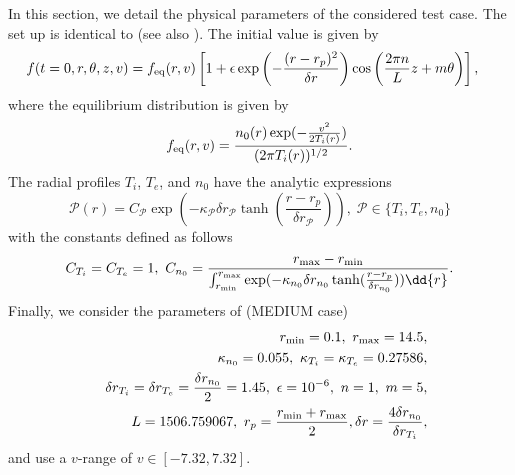 In this section, we detail the physical parameters of the considered test case. The set up is identical to \cite{Crouseilles:2018} (see also \cite{Coulette:2013, Crouseilles:2014}). The initial value is given by 
\begin{align*}
  f(t=0,r,\theta,z,v) &=
  f_{\rm eq}(r,v)\left[1+\epsilon \exp\left(-\frac{(r-r_p)^2}{\delta r}\right)\cos\left(\frac{2\pi n}{L}z+m\theta\right)\right],
\end{align*}
where the equilibrium distribution is given by
\begin{equation} \label{eq:equilibrium}
  f_{\rm eq}(r,v)=\frac{n_0(r)\exp(-\frac{v^2}{2T_i(r)})}{(2\pi T_i(r))^{1/2}}.
\end{equation}
The radial profiles $T_i$, $T_e$, and $n_0$ have the analytic expressions
$$
  \mathcal{P}(r) = C_\mathcal{P}\exp\left(-\kappa_\mathcal{P}\delta r_{\mathcal{P}}\tanh(\frac{r-r_p}{\delta r_{\mathcal{P}}})\right), \; \mathcal{P}\in \{T_i,T_e,n_0\}
$$
with the constants defined as follows
$$
  C_{T_i}=C_{T_e}=1,\ C_{n_0}=\frac{r_{\rm max}-r_{\rm min}}{
\int_{r_{\rm min}}^{r_{\rm max}}\exp(-\kappa_{n_0}\delta r_{n_0}\tanh(\frac{r-r_p}{\delta r_{n_0}}))\dd{r}}.
$$
Finally, we consider the parameters of \cite{Coulette:2013} (MEDIUM case)
\begin{eqnarray*}
  &&r_{\rm min} = 0.1,\ r_{\rm max} = 14.5,\\
  && \kappa_{n_0}= 0.055,\ \kappa_{T_i}=\kappa_{T_e}= 0.27586,\\
  &&\delta r_{T_i}=\delta r_{T_e}=\frac{\delta r_{n_0}}{2}= 1.45,\ \epsilon=10^{-6},\ n=1,\ m=5,\\
  &&L=1506.759067,\ r_p = \frac{r_{\rm min}+r_{\rm max}}{2},\delta r = \frac{4 \delta r_{n_0}}{\delta r_{T_i}},
\end{eqnarray*}
and use a $v$-range of $v \in [-7.32,7.32]$.

